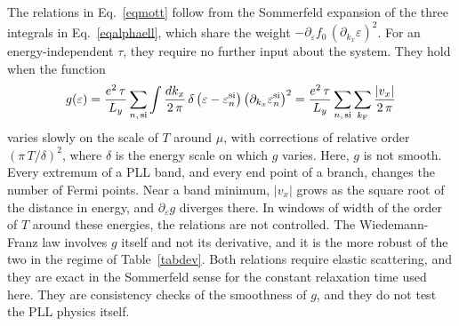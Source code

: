 \documentclass[aps,prb, onecolumn, nofootinbib, citeautoscript,10pt]{revtex4-2}
\newcommand{\red}[1]{{\color{red}#1}}
\begin{document}
The relations in Eq.~\eqref{eqmott} follow from the Sommerfeld expansion of the three integrals in Eq.~\eqref{eqalphaell}, which share the weight $-\partial_\varepsilon f_0\,(\partial_{k_x}\varepsilon)^2$. For an energy-independent $\tau$, they require no further input about the system. They hold when the function
\begin{align}
g(\varepsilon)=\frac{e^2\,\tau}{L_y}\sum_{n,\,{\rm si}}\int\frac{dk_x}{2\,\pi}\,\delta\left(\varepsilon-\varepsilon_n^{\rm si}\right)\left(\partial_{k_x}\varepsilon^{\rm si}_n\right)^2=\frac{e^2\,\tau}{L_y}\sum_{n,\,{\rm si}}\sum_{k_{\rm F}}\frac{|v_x|}{2\,\pi}
\end{align}
varies slowly on the scale of $T$ around $\mu$, with corrections of relative order $(\pi\,T/\delta)^2$, where $\delta$ is the energy scale on which $g$ varies. Here, $g$ is not smooth. Every extremum of a PLL band, and every end point of a branch, changes the number of Fermi points. Near a band minimum, $|v_x|$ grows as the square root of the distance in energy, and $\partial_\varepsilon g$ diverges there. In windows of width of the order of $T$ around these energies, the relations are not controlled. The Wiedemann-Franz law involves $g$ itself and not its derivative, and it is the more robust of the two\red{ in the regime of Table~\ref{tabdev}}. Both relations require elastic scattering, and they are exact in the Sommerfeld sense for the constant relaxation time used here. They are consistency checks of the smoothness of $g$, and they do not test the PLL physics itself.
\end{document}

